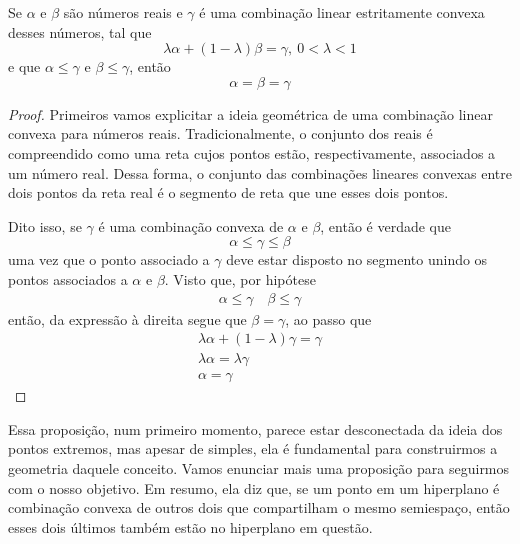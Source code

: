 \begin{prop:combinação convexa}
	\label{prop:combinação convexa}
	Se $\alpha$ e $\beta$ são números reais e $\gamma$ é uma combinação linear estritamente convexa desses números, tal que
	\[\lambda \alpha + (1- \lambda) \beta = \gamma,\ 0 < \lambda < 1\]e que $\alpha \leq \gamma$ e $\beta \leq \gamma$, então \[\alpha = \beta = \gamma\]
	
	\begin{proof}
		Primeiros vamos explicitar a ideia geométrica de uma combinação linear convexa para números reais. Tradicionalmente, o conjunto dos reais é compreendido como uma reta cujos pontos estão, respectivamente, associados a um número real. Dessa forma, o conjunto das combinações lineares convexas entre dois pontos da reta real é o segmento de reta que une esses dois pontos.
		
		Dito isso, se $\gamma$ é uma combinação convexa de $\alpha$ e $\beta$, então é verdade que \[\alpha \leq \gamma \leq \beta\]uma vez que o ponto associado a $\gamma$ deve estar disposto no segmento unindo os pontos associados a $\alpha$ e $\beta$.	Visto que, por hipótese
		\begin{align*}
			\alpha \leq \gamma \quad \beta \leq \gamma
		\end{align*}
		então, da expressão à direita segue que $\beta = \gamma$, ao passo que
		\begin{gather*}
			\lambda \alpha + (1 - \lambda) \gamma = \gamma \\
			\lambda \alpha = \lambda \gamma \\
			\alpha = \gamma
		\end{gather*}
	\end{proof}
\end{prop:combinação convexa}

Essa proposição, num primeiro momento, parece estar desconectada da ideia dos pontos extremos, mas apesar de simples, ela é fundamental para construirmos a geometria daquele conceito. Vamos enunciar mais uma proposição para seguirmos com o nosso objetivo. Em resumo, ela diz que, se um ponto em um hiperplano é combinação convexa de outros dois que compartilham o mesmo semiespaço, então esses dois últimos também estão no hiperplano em questão.

